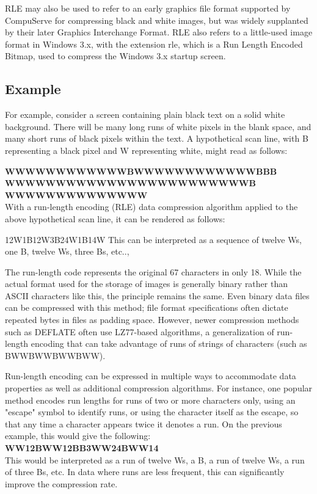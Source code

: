\documentclass[15pt,a4paper]{article}
\begin{document}
	RLE may also be used to refer to an early graphics file format supported by CompuServe for compressing black and white images, but was widely supplanted by their later Graphics Interchange Format. RLE also refers to a little-used image format in Windows 3.x, with the extension rle, which is a Run Length Encoded Bitmap, used to compress the Windows 3.x startup screen.
	
	\subsection{Example}
	For example, consider a screen containing plain black text on a solid white background. There will be many long runs of white pixels in the blank space, and many short runs of black pixels within the text. A hypothetical scan line, with B representing a black pixel and W representing white, might read as follows:
	
	\textbf{WWWWWWWWWWWWBWWWWWWWWWWWWBBB\\WWWWWWWWWWWWWWWWWWWWWWWWB\\WWWWWWWWWWWWWW}
	\\With a run-length encoding (RLE) data compression algorithm applied to the above hypothetical scan line, it can be rendered as follows:
	
	12W1B12W3B24W1B14W
	This can be interpreted as a sequence of twelve Ws, one B, twelve Ws, three Bs, etc..,
	
	The run-length code represents the original 67 characters in only 18. While the actual format used for the storage of images is generally binary rather than ASCII characters like this, the principle remains the same. Even binary data files can be compressed with this method; file format specifications often dictate repeated bytes in files as padding space. However, newer compression methods such as DEFLATE often use LZ77-based algorithms, a generalization of run-length encoding that can take advantage of runs of strings of characters (such as BWWBWWBWWBWW).
	
	Run-length encoding can be expressed in multiple ways to accommodate data properties as well as additional compression algorithms. For instance, one popular method encodes run lengths for runs of two or more characters only, using an "escape" symbol to identify runs, or using the character itself as the escape, so that any time a character appears twice it denotes a run. On the previous example, this would give the following:
	\\\textbf{WW12BWW12BB3WW24BWW14}
	\\This would be interpreted as a run of twelve Ws, a B, a run of twelve Ws, a run of three Bs, etc. In data where runs are less frequent, this can significantly improve the compression rate.
	
\end{document}
